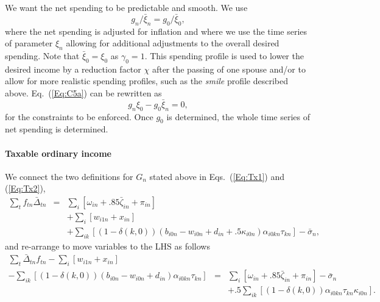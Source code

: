 \documentclass{report}[fleqn,12pt]
\begin{document}
	We want the net spending to be predictable and smooth. We use
\begin{equation}
	\label{Eq:C5a}
	g_{n}/\bar{\xi}_{n} = g_0/\bar{\xi}_0,
\end{equation}
where the net spending is adjusted for inflation and where we use the time series of parameter $\xi_n$ 
allowing for additional adjustments to the overall desired spending.
Note that $\bar{\xi}_0 = \xi_0$ as $\gamma_0=1$.
This spending profile is used to lower the desired income by a reduction factor $\chi$
after the passing of one spouse and/or to allow for more realistic spending profiles, such as
the {\em smile} profile described above.
Eq.~(\ref{Eq:C5a}) can be rewritten as
\begin{equation}
	\label{Eq:C5}
	g_n \xi_0 - g_0 \bar{\xi}_n = 0,
\end{equation}
for the constraints to be enforced. Once $g_0$ is determined, the whole time series of net spending
is determined.

\paragraph*{Taxable ordinary income}
	We connect the two definitions for $G_n$ stated above in Eqs.~(\ref{Eq:Tx1}) and (\ref{Eq:Tx2}),
	\begin{eqnarray}
		\sum_t f_{t n}\bar{\Delta}_{t n} &=&
		\sum_i [\omega_{in} + .85\bar\zeta_{in} + \pi_{in}]  \nonumber \\
		&& + \sum_{i} [w_{i1n} + x_{in} ]
		\nonumber\\
		&& + \sum_{ik} [(1 - \delta(k, 0))(b_{i0n} - w_{i0n} + d_{in} + .5\kappa_{i0n})\alpha_{i0kn}\tau_{kn}] - \bar{\sigma}_n,
	\end{eqnarray}
	and re-arrange to move variables to the LHS as follows
	\begin{eqnarray}
		\label{Eq:C6}
		\sum_t \bar{\Delta}_{t n} f_{t n}
		- \sum_{i} [ w_{i1n} + x_{in}] &&
		\nonumber \\
		- \sum_{ik} [(1 - \delta(k, 0))(b_{i0n} - w_{i0n} + d_{in})\alpha_{i0kn}\tau_{kn}] &=&
		\sum_i [\omega_{in} + .85\bar\zeta_{in} + \pi_{in} ] 
		- \bar{\sigma}_n
		\nonumber \\
		&& + .5\sum_{ik} [(1-\delta(k, 0))\alpha_{i0kn}\tau_{kn}\kappa_{i0n}].
	\end{eqnarray}
\end{document}
